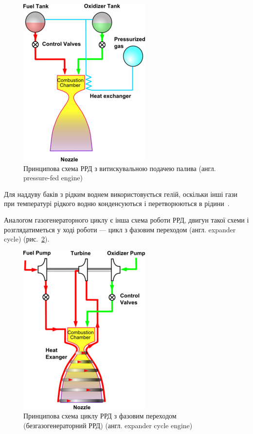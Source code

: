 \begin{figure}
    \centering
    \includegraphics[width=0.4\textheight, angle=0,origin=c]{chapter_1/Pressure_fed_rocket_cycle.png}
    \caption{Принципова схема РРД з витискувальною подачею палива (англ. pressure-fed engine)}
    \label{fig:pressure_fed}
\end{figure}

Для наддуву баків з рідким воднем використовується гелій, оскільки інші гази при температурі рідкого водню конденсуються і перетворюються в рідини~\cite{Dorofeyev}.

Аналогом газогенераторного циклу є інша схема роботи РРД, двигун такої схеми і розглядатиметься  у ході роботи --- цикл з фазовим переходом (англ. expander cycle) (рис.~\ref{fig:expander_cycle}).

\begin{figure}
    \centering
    \includegraphics[width=0.4\textheight, angle=0,origin=c]{chapter_1/Expander_rocket_cycle.png}
    \caption{Принципова схема циклу РРД з фазовим переходом (безгазогенераторний РРД) (англ. expander cycle engine)}
    \label{fig:expander_cycle}
\end{figure}

